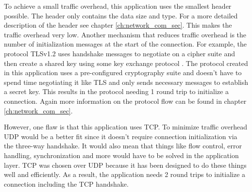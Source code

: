 To achieve a small traffic overhead, this application uses the smallest header possible. The header only contains the data size and type. For a more detailed description of the header see chapter \ref{ch:network_com_sec}. This makes the traffic overhead very low. Another mechanism that reduces traffic overhead is the number of initialization messages at the start of the connection. For example, the protocol TLSv1.2 uses handshake messages to negotiate on a cipher suite and then create a shared key using some key exchange protocol \cite{Ristic2014}. The protocol created in this application uses a pre-configured cryptography suite and doesn't have to spend time negotiating it like TLS and only sends necessary messages to establish a secret key. This results in the protocol needing 1 round trip to initialize a connection. Again more information on the protocol flow can be found in chapter \ref{ch:network_com_sec}.

However, one flaw is that this application uses TCP. To minimize traffic overhead UDP would be a better fit since it doesn't require connection initialization via the three-way handshake. It would also mean that things like flow control, error handling, synchronization and more would have to be solved in the application layer. TCP was chosen over UDP because it has been designed to do these things well and efficiently. As a result, the application needs 2 round trips to initialize a connection including the TCP handshake.
